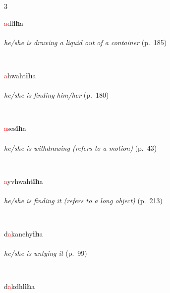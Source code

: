 \documentclass[oneside,openany]{book}%
\begin{document}
\noindent\begin{multicols}{3}%
\begin{minipage}[t]{\linewidth}
\raggedright\noindent \textcolor{Red}{a}dl\textbf{ih}a\\
\\
\noindent \textit{he/she is drawing a liquid out of a container} (p.~185)
\end{minipage}\\[1em]%
\begin{minipage}[t]{\linewidth}
\raggedright\noindent \textcolor{Red}{a}hwaht\textbf{ih}a\\
\\
\noindent \textit{he/she is finding him/her} (p.~180)
\end{minipage}\\[1em]%
\begin{minipage}[t]{\linewidth}
\raggedright\noindent \textcolor{Red}{a}ses\textbf{ih}a\\
\\
\noindent \textit{he/she is withdrawing (refers to a motion)} (p.~43)
\end{minipage}\\[1em]%
\begin{minipage}[t]{\linewidth}
\raggedright\noindent \textcolor{Red}{a}yvhwaht\textbf{ih}a\\
\\
\noindent \textit{he/she is finding it (refers to a long object)} (p.~213)
\end{minipage}\\[1em]%
\begin{minipage}[t]{\linewidth}
\raggedright\noindent d\textcolor{Red}{a}kanehy\textbf{ih}a\\
\\
\noindent \textit{he/she is untying it} (p.~99)
\end{minipage}\\[1em]%
\begin{minipage}[t]{\linewidth}
\raggedright\noindent d\textcolor{Red}{a}kdhl\textbf{ih}a\\
\\

\end{minipage}
\end{multicols}
\end{document}
